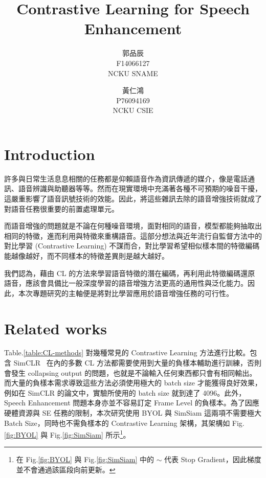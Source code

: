 \documentclass[10pt,twocolumn,letterpaper]{article}
\begin{document}
\begin{CJK}{UTF8}{bkai}
   \title{Contrastive Learning for Speech Enhancement}

   \author{郭品辰\\
      F14066127\\
      NCKU SNAME
      \and
      黃仁鴻\\
      P76094169\\
      NCKU CSIE}

   \maketitle

   \section{Introduction}

   許多與日常生活息息相關的任務都是仰賴語音作為資訊傳遞的媒介，像是電話通訊、語音辨識與助聽器等等。然而在現實環境中充滿著各種不可預期的噪音干擾，這嚴重影響了語音訊號技術的效能。因此，將這些雜訊去除的語音增強技術就成了對語音任務很重要的前置處理單元。

   而語音增強的問題就是不論在何種噪音環境，面對相同的語音，模型都能夠抽取出相同的特徵，進而利用與特徵來重構語音。這部分想法與近年流行自監督方法中的對比學習
   (Contrastive Learning) 不謀而合，對比學習希望相似樣本間的特徵編碼能越像越好，而不同樣本的特徵差異則是越大越好。

   我們認為，藉由 CL 的方法來學習語音特徵的潛在編碼，再利用此特徵編碼還原語音，應該會具備比一般深度學習的語音增強方法更高的通用性與泛化能力。因此，本次專題研究的主軸便是將對比學習應用於語音增強任務的可行性。
   \section{Related works}

   Table.\ref{table:CL-methods} 對幾種常見的 Contrastive Learning 方法進行比較。包含 SimCLR~\cite{SimCLR} 在內的多數
   CL 方法都需要使用到大量的負樣本輔助進行訓練，否則會發生 collapsing output
   的問題，也就是不論輸入任何東西都只會有相同輸出。而大量的負樣本需求導致這些方法必須使用極大的 batch size 才能獲得良好效果，例如在
   SimCLR 的論文中，實驗所使用的 batch size 就到達了 4096。此外，Speech Enhancement 問題本身亦並不容易訂定 Frame Level
   的負樣本。為了因應硬體資源與 SE 任務的限制，本次研究使用 BYOL\cite{BYOL} 與 SimSiam\cite{SimSiam} 這兩項不需要極大 Batch Size，同時也不需負樣本的
   Contrastive Learning 架構，其架構如 Fig.\ref{fig:BYOL} 與 Fig.\ref{fig:SimSiam} 所示\footnote{在
      Fig.\ref{fig:BYOL} 與 Fig.\ref{fig:SimSiam} 中的 $\sim$ 代表 Stop Gradient，因此梯度並不會通過該區段向前更新。}。


\end{CJK}
\end{document}
